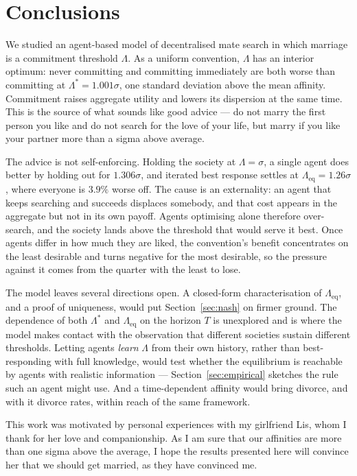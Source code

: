 \documentclass[sigconf,anonymous]{aamas}
\newcommand{\Leq}{\Lambda_{\mathrm{eq}}}
\newcommand{\Lopt}{\Lambda^\ast}
\begin{document}

\section{Conclusions}

We studied an agent-based model of decentralised mate search in which marriage
is a commitment threshold $\Lambda$. As a uniform convention, $\Lambda$ has an
interior optimum: never committing and committing immediately are both worse
than committing at $\Lopt = 1.001\sigma$, one standard deviation above the mean
affinity. Commitment raises aggregate utility and lowers its dispersion at the
same time. This is the source of what sounds like good advice --- do not marry
the first person you like and do not search for the love of your life, but marry
if you like your partner more than a sigma above average.

The advice is not self-enforcing. Holding the society at $\Lambda = \sigma$, a
single agent does better by holding out for $1.306\sigma$, and iterated best
response settles at $\Leq = 1.26\sigma$, where everyone is $3.9\%$ worse off.
The cause is an externality: an agent that keeps searching and succeeds displaces
somebody, and that cost appears in the aggregate but not in its own payoff.
Agents optimising alone therefore over-search, and the society lands above the
threshold that would serve it best. Once agents differ in how much they are
liked, the convention's benefit concentrates on the least desirable and turns
negative for the most desirable, so the pressure against it comes from the
quarter with the least to lose.

The model leaves several directions open. A closed-form characterisation of
$\Leq$, and a proof of uniqueness, would put Section~\ref{sec:nash} on firmer
ground. The dependence of both $\Lopt$ and $\Leq$ on the horizon $T$ is
unexplored and is where the model makes contact with the observation that
different societies sustain different thresholds. Letting agents \emph{learn}
$\Lambda$ from their own history, rather than best-responding with full
knowledge, would test whether the equilibrium is reachable by agents with
realistic information --- Section~\ref{sec:empirical} sketches the rule such an
agent might use. And a time-dependent affinity would bring divorce, and with it
divorce rates, within reach of the same framework.


\begin{acks}
This work was motivated by personal experiences with my girlfriend Lis, whom I
thank for her love and companionship. As I am sure that our affinities are more
than one sigma above the average, I hope the results presented here will convince
her that we should get married, as they have convinced me.
\end{acks}




\end{document}
